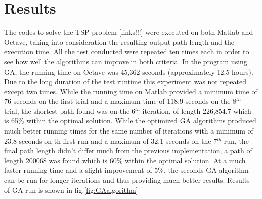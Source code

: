 \documentclass[twocolumn]{article}
\begin{document}
	\section{Results}
	The codes to solve the TSP problem [links!!!] were executed on both Matlab and Octave, taking into consideration the resulting output path length and the execution time. All the test conducted were repeated ten times each in order to see how well the algorithms can improve in both criteria. In the program using GA, the running time on Octave was 45,362 seconds (approximately 12.5 hours). Due to the long duration of the test runtime this experiment was not repeated except two times. While the running time on Matlab provided a minimum time of 76 seconds on the first trial and a maximum time of 118.9 seconds on the 8$^{th}$ trial, the shortest path found was on the 6$^{th}$ iteration, of length 226,854.7 which is 65\% within the optimal solution. While the optimized GA algorithms produced much better running times for the same number of iterations with a minimum of 23.8 seconds on th first run and a maximum of 32.1 seconds on the 7$^{th}$ run, the final path length didn't differ much from the previous implementation, a path of length 200068 was found which is 60\% within the optimal solution. At a much faster running time and a slight improvement of 5\%, the seconds GA algorithm can be run for longer iterations and thus providing much better results. Results of GA run is shown in fig.\ref{fig:GAalgorithm}
	
\end{document}
